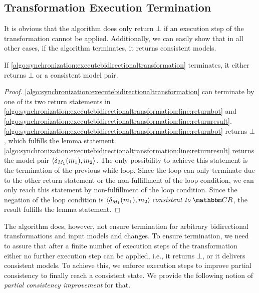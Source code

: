 \subsection{Transformation Execution Termination}

It is obvious that the algorithm does only return $\bot$ if an execution step of the transformation cannot be applied.
Additionally, we can easily show that in all other cases, if the algorithm terminates, it returns consistent models.

\begin{lemma}
    \label{lemma:bidirectionaltransformationconsistency}
    If \autoref{algo:synchronization:executebidirectionaltransformation} terminates, it either returns $\bot$ or a consistent model pair.
\end{lemma}
\begin{proof}
    \autoref{algo:synchronization:executebidirectionaltransformation} can terminate by one of its two return statements in \autoref{algo:synchronization:executebidirectionaltransformation:line:returnbot} and \autoref{algo:synchronization:executebidirectionaltransformation:line:returnresult}.
    \autoref{algo:synchronization:executebidirectionaltransformation:line:returnbot} returns $\bot$, which fulfills the lemma statement.
    \autoref{algo:synchronization:executebidirectionaltransformation:line:returnresult} returns the model pair $\langle \delta_{M_{1}}(m_{1}), m_{2} \rangle$.
    The only possibility to achieve this statement is the termination of the previous while loop.
    Since the loop can only terminate due to the other return statement or the non-fulfillment of the loop condition, we can only reach this statement by non-fulfillment of the loop condition.
    Since the negation of the loop condition is $\tupled{\change{\metamodel{M}{1}}(\model{m}{1}), \model{m}{2}} \consistenttomath \consistencyrelationset{CR}$, the result fulfills the lemma statement.
\end{proof}

The algorithm does, however, not ensure termination for arbitrary bidirectional transformations and input models and changes.
To ensure termination, we need to assure that after a finite number of execution steps of the transformation either no further execution step can be applied, i.e., it returns $\bot$, or it delivers consistent models.
To achieve this, we enforce execution steps to improve partial consistency to finally reach a consistent state. 
We provide the following notion of \emph{partial consistency improvement} for that.

